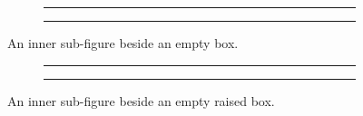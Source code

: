 \documentclass{article}
\begin{document}
\begin{figure}
  \centering
  \begin{subfigure}{0.6\textwidth}
    \rule{0.45\linewidth}{1cm}\hfill\rule{0.45\linewidth}{1cm}
  \end{subfigure}%
  \makebox[0pt]{\textbf{}}%
  \caption{An inner sub-figure beside an empty box.}
\end{figure}
\begin{figure}
  \centering
  \begin{subfigure}{0.6\textwidth}
    \rule{0.45\linewidth}{1cm}\hfill\rule{0.45\linewidth}{1cm}
  \end{subfigure}%
  \raisebox{0pt}{}%
  \caption{An inner sub-figure beside an empty raised box.}
\end{figure}
\end{document}
